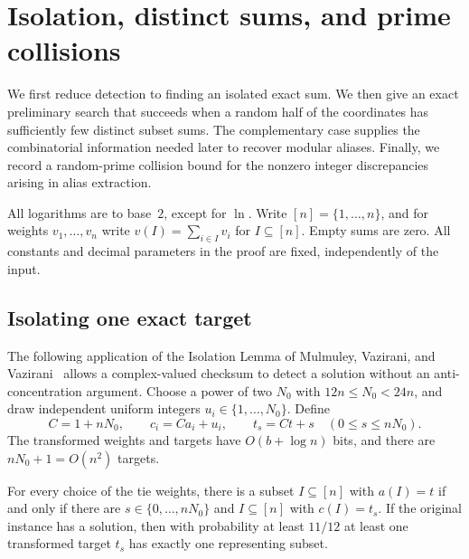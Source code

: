 \section{Isolation, distinct sums, and prime collisions}
\label{sec:setup}

We first reduce detection to finding an isolated exact sum.  We then give
an exact preliminary search that succeeds when a random half of the
coordinates has sufficiently few distinct subset sums.  The complementary
case supplies the combinatorial information needed later to recover
modular aliases.  Finally, we record a random-prime collision bound
for the nonzero integer discrepancies arising in alias extraction.

All logarithms are to base~$2$, except for $\ln$.  Write
$[n]=\{1,\ldots,n\}$, and for weights $v_1,\ldots,v_n$ write
$v(I)=\sum_{i\in I}v_i$ for $I\subseteq[n]$.  Empty sums are zero.
All constants and decimal parameters in the proof are fixed, independently
of the input.

\subsection{Isolating one exact target}

The following application of the Isolation Lemma of
Mulmuley, Vazirani, and Vazirani~\cite{MVV1987} allows a complex-valued
checksum to detect a solution without an anti-concentration argument.
Choose a power of two $N_0$ with $12n\le N_0<24n$, and draw independent
uniform integers $u_i\in\{1,\ldots,N_0\}$.  Define
\begin{equation}
\label{eq:transformed}
 C=1+nN_0,\qquad c_i=Ca_i+u_i,\qquad
 t_s=Ct+s\quad(0\le s\le nN_0).
\end{equation}
The transformed weights and targets have $O(b+\log n)$ bits, and there
are $nN_0+1=O(n^2)$ targets.

\begin{lemma}[Isolation]
\label{lem:isolation}
For every choice of the tie weights, there is a subset $I\subseteq[n]$
with $a(I)=t$ if and only if there are $s\in\{0,\ldots,nN_0\}$ and
$I\subseteq[n]$ with $c(I)=t_s$.  If the original instance has a
solution, then with probability at least $11/12$ at least one transformed
target $t_s$ has exactly one representing subset.
\end{lemma}

